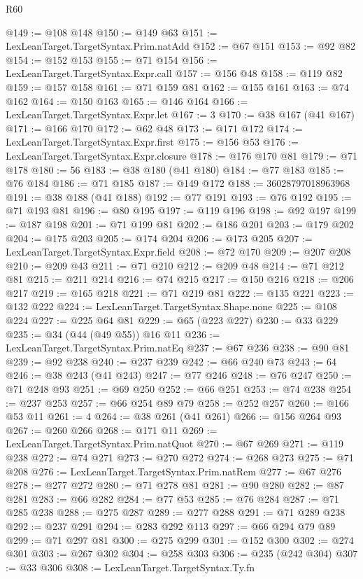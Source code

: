 \begin{lexlean}{R60}
\begin{coremodule}
@149 := @108 @148
@150 := @149 @63
@151 := LexLeanTarget.TargetSyntax.Prim.natAdd
@152 := @67 @151
@153 := @92 @82
@154 := @152 @153
@155 := @71 @154
@156 := LexLeanTarget.TargetSyntax.Expr.call
@157 := @156 @48
@158 := @119 @82
@159 := @157 @158
@161 := @71 @159 @81
@162 := @155 @161
@163 := @74 @162
@164 := @150 @163
@165 := @146 @164
@166 := LexLeanTarget.TargetSyntax.Expr.let
@167 := 3
@170 := @38 @167 (@41 @167)
@171 := @166 @170
@172 := @62 @48
@173 := @171 @172
@174 := LexLeanTarget.TargetSyntax.Expr.first
@175 := @156 @53
@176 := LexLeanTarget.TargetSyntax.Expr.closure
@178 := @176 @170 @81
@179 := @71 @178
@180 := 56
@183 := @38 @180 (@41 @180)
@184 := @77 @183
@185 := @76 @184
@186 := @71 @185
@187 := @149 @172
@188 := 36028797018963968
@191 := @38 @188 (@41 @188)
@192 := @77 @191
@193 := @76 @192
@195 := @71 @193 @81
@196 := @80 @195
@197 := @119 @196
@198 := @92 @197
@199 := @187 @198
@201 := @71 @199 @81
@202 := @186 @201
@203 := @179 @202
@204 := @175 @203
@205 := @174 @204
@206 := @173 @205
@207 := LexLeanTarget.TargetSyntax.Expr.field
@208 := @72 @170
@209 := @207 @208
@210 := @209 @43
@211 := @71 @210
@212 := @209 @48
@214 := @71 @212 @81
@215 := @211 @214
@216 := @74 @215
@217 := @150 @216
@218 := @206 @217
@219 := @165 @218
@221 := @71 @219 @81
@222 := @135 @221
@223 := @132 @222
@224 := LexLeanTarget.TargetSyntax.Shape.none
@225 := @108 @224
@227 := @225 @64 @81
@229 := @65 (@223 @227)
@230 := @33 @229
@235 := @34 (@44 (@49 @55)) @16 @11
@236 := LexLeanTarget.TargetSyntax.Prim.natEq
@237 := @67 @236
@238 := @90 @81
@239 := @92 @238
@240 := @237 @239
@242 := @66 @240 @73
@243 := 64
@246 := @38 @243 (@41 @243)
@247 := @77 @246
@248 := @76 @247
@250 := @71 @248 @93
@251 := @69 @250
@252 := @66 @251
@253 := @74 @238
@254 := @237 @253
@257 := @66 @254 @89 @79
@258 := @252 @257
@260 := @166 @53 @11
@261 := 4
@264 := @38 @261 (@41 @261)
@266 := @156 @264 @93
@267 := @260 @266
@268 := @171 @11
@269 := LexLeanTarget.TargetSyntax.Prim.natQuot
@270 := @67 @269
@271 := @119 @238
@272 := @74 @271
@273 := @270 @272
@274 := @268 @273
@275 := @71 @208
@276 := LexLeanTarget.TargetSyntax.Prim.natRem
@277 := @67 @276
@278 := @277 @272
@280 := @71 @278 @81
@281 := @90 @280
@282 := @87 @281
@283 := @66 @282
@284 := @77 @53
@285 := @76 @284
@287 := @71 @285 @238
@288 := @275 @287
@289 := @277 @288
@291 := @71 @289 @238
@292 := @237 @291
@294 := @283 @292 @113
@297 := @66 @294 @79 @89
@299 := @71 @297 @81
@300 := @275 @299
@301 := @152 @300
@302 := @274 @301
@303 := @267 @302
@304 := @258 @303
@306 := @235 (@242 @304)
@307 := @33 @306
@308 := LexLeanTarget.TargetSyntax.Ty.fn

\end{coremodule}
\end{lexlean}

